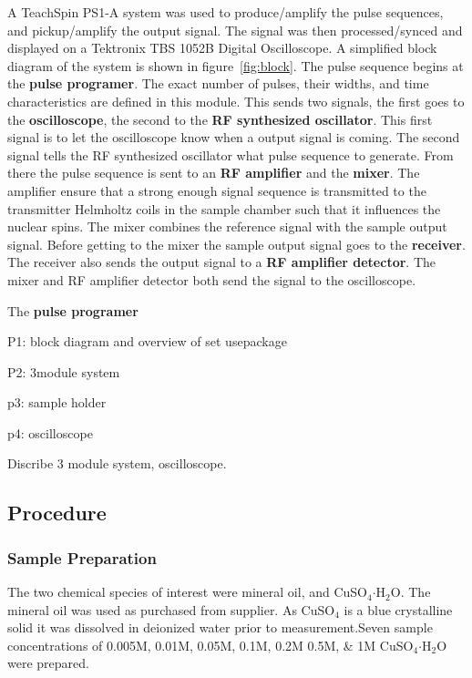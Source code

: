 \documentclass[
reprint,
amsmath,amssymb,
aps,
tikz,
border=5pt
]{revtex4-1}
\begin{document}
    A TeachSpin PS1-A system was used to produce/amplify the pulse sequences, and pickup/amplify the output signal. The signal was then processed/synced and displayed on a Tektronix TBS 1052B Digital Oscilloscope. A simplified block diagram of the system is shown in figure~\ref{fig:block}. The pulse sequence begins at the \textbf{pulse programer}. The exact number of pulses, their widths, and time characteristics are defined in this module. This sends two signals, the first goes to the \textbf{oscilloscope}, the second to the \textbf{RF synthesized oscillator}. This first signal is to let the oscilloscope know when a output signal is coming. The second signal tells the RF synthesized oscillator what pulse sequence to generate. From there the pulse sequence is sent to an \textbf{RF amplifier} and the \textbf{mixer}. The amplifier ensure that a strong enough signal sequence is transmitted to the transmitter Helmholtz coils in the sample chamber such that it influences the nuclear spins. The mixer combines the reference signal with the sample output signal. Before getting to the mixer the sample output signal goes to the \textbf{receiver}. The receiver also sends the output signal to a \textbf{RF amplifier detector}. The mixer and RF amplifier detector both send the signal to the oscilloscope. 
    
    The \textbf{pulse programer}
    
    
  
    
    
    P1: block diagram and overview of set usepackage
    
    P2: 3module system

    p3: sample holder

    p4: oscilloscope


Discribe 3 module system,  oscilloscope. 


\subsection*{Procedure}

\subsubsection*{Sample Preparation} 
    The two chemical species of interest were mineral oil, and CuSO$_{4} \boldsymbol{\cdot} $H$_2$O. The mineral oil was used as purchased from supplier. As CuSO$_{4}$ is a blue crystalline solid it was dissolved in deionized water prior to measurement.Seven sample concentrations of 0.005M, 0.01M, 0.05M, 0.1M, 0.2M 0.5M, \& 1M CuSO$_{4} \boldsymbol{\cdot} $H$_2$O were prepared. 
\end{document}
